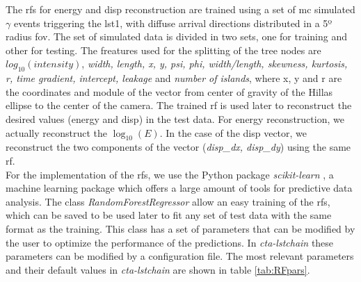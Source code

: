 \documentclass[main.tex]{subfiles}
\begin{document}
The \glspl{rf} for energy and disp reconstruction are trained using a set of \gls{mc} simulated $\gamma$ events triggering the \gls{lst}1, with diffuse arrival directions distributed in a 5º radius \gls{fov}. The set of simulated data is divided in two sets, one for training and other for testing. The freatures used for the splitting of the tree nodes are $log_{10}(intensity)$, \textit{width, length, x, y, psi, phi, width/length, skewness, kurtosis, r, time gradient, intercept, leakage} and \textit{number of islands}, where x, y and r are the coordinates and module of the vector from center of gravity of the Hillas ellipse to the center of the camera. The trained \gls{rf} is used later to reconstruct the desired values (energy and disp) in the test data.
For energy reconstruction, we actually reconstruct the $\log_{10}(E)$. In the case of the disp vector, we reconstruct the two components of the vector (\textit{disp\_dx, disp\_dy}) using the same \gls{rf}.\\
For the implementation of the \glspl{rf}, we use the Python package \textit{scikit-learn} \cite{2011scikit-learn}, a machine learning package which offers a large amount of tools for predictive data analysis. The class \textit{RandomForestRegressor} allow an easy training of the \glspl{rf}, which can be saved to be used later to fit any set of test data with the same format as the training. This class has a set of parameters that can be modified by the user to optimize the performance of the predictions. In \textit{cta-lstchain} these parameters can be modified by a configuration file. The most relevant parameters and their default values in \textit{cta-lstchain} are shown in table \ref{tab:RFpars}. 
\end{document}
